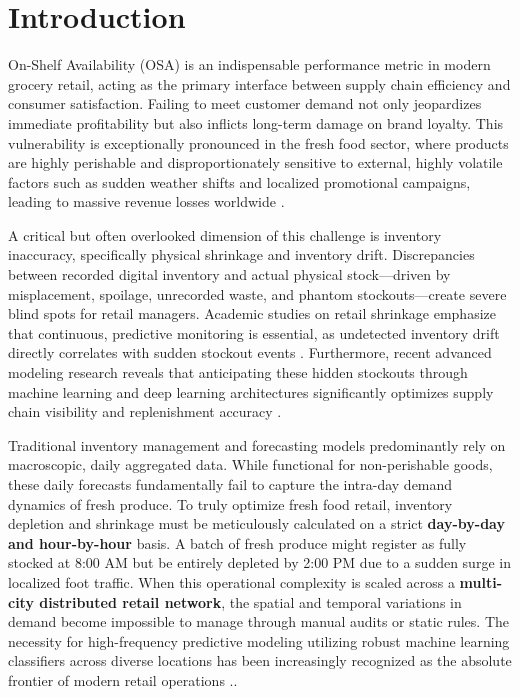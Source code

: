 \documentclass[11pt, a4paper]{article}
\begin{document}
\section{Introduction}

On-Shelf Availability (OSA) is an indispensable performance metric in modern grocery retail, acting as the primary interface between supply chain efficiency and consumer satisfaction. Failing to meet customer demand not only jeopardizes immediate profitability but also inflicts long-term damage on brand loyalty. This vulnerability is exceptionally pronounced in the fresh food sector, where products are highly perishable and disproportionately sensitive to external, highly volatile factors such as sudden weather shifts and localized promotional campaigns, leading to massive revenue losses worldwide \cite{gruen2008}. 

A critical but often overlooked dimension of this challenge is inventory inaccuracy, specifically physical shrinkage and inventory drift. Discrepancies between recorded digital inventory and actual physical stock---driven by misplacement, spoilage, unrecorded waste, and phantom stockouts---create severe blind spots for retail managers. Academic studies on retail shrinkage emphasize that continuous, predictive monitoring is essential, as undetected inventory drift directly correlates with sudden stockout events \cite{kang2005shrinkage}. Furthermore, recent advanced modeling research reveals that anticipating these hidden stockouts through machine learning and deep learning architectures significantly optimizes supply chain visibility and replenishment accuracy \cite{oroojlooyjadid2017}. 

Traditional inventory management and forecasting models predominantly rely on macroscopic, daily aggregated data. While functional for non-perishable goods, these daily forecasts fundamentally fail to capture the intra-day demand dynamics of fresh produce. To truly optimize fresh food retail, inventory depletion and shrinkage must be meticulously calculated on a strict \textbf{day-by-day and hour-by-hour} basis. A batch of fresh produce might register as fully stocked at 8:00 AM but be entirely depleted by 2:00 PM due to a sudden surge in localized foot traffic. When this operational complexity is scaled across a \textbf{multi-city distributed retail network}, the spatial and temporal variations in demand become impossible to manage through manual audits or static rules. The necessity for high-frequency predictive modeling utilizing robust machine learning classifiers across diverse locations has been increasingly recognized as the absolute frontier of modern retail operations \cite{kurian2020}..
\end{document}
